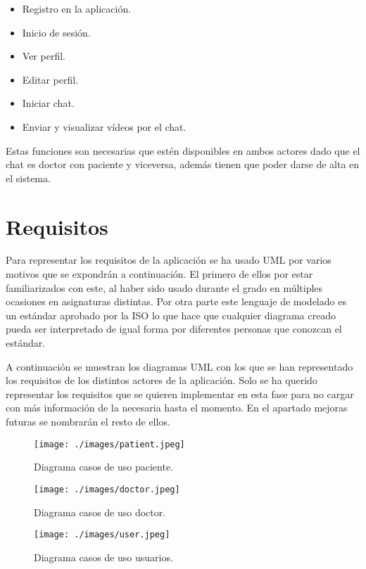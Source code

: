\begin{itemize}
    \item Registro en la aplicación.
    \item Inicio de sesión.
    \item Ver perfil.
    \item Editar perfil.
    \item Iniciar chat.
    \item Enviar y visualizar vídeos por el chat.
\end{itemize}

Estas funciones son necesarias que estén disponibles en ambos actores dado que el chat
es doctor con paciente y viceversa, además tienen que poder darse de alta en el sistema.

\section{Requisitos}
Para representar los requisitos de la aplicación se ha usado UML\cite{uml} por varios
motivos que se expondrán a continuación. El primero de ellos por estar familiarizados
con este, al haber sido usado durante el grado en múltiples ocasiones en asignaturas
distintas. Por otra parte este lenguaje de modelado es un estándar aprobado por la ISO
lo que hace que cualquier diagrama creado pueda ser interpretado de igual forma por
diferentes personas que conozcan el estándar.

\medskip
A continuación se muestran los diagramas UML con los que se han representado los
requisitos de los distintos actores de la aplicación. Solo se ha querido representar los
requisitos que se quieren implementar en esta fase para no cargar con más información de
la necesaria hasta el momento. En el apartado mejoras futuras se nombrarán el resto de ellos.

\medskip
\begin{figure}
    \texttt{[image: ./images/patient.jpeg]}
    \caption{Diagrama casos de uso paciente.}
    \label{Diagrama casos de uso paciente.}
\end{figure}

\medskip
\begin{figure}
    \texttt{[image: ./images/doctor.jpeg]}
    \caption{Diagrama casos de uso doctor.}
    \label{Diagrama casos de uso doctor.}
\end{figure}

\medskip
\begin{figure}
    \texttt{[image: ./images/user.jpeg]}
    \caption{Diagrama casos de uso usuarios.}
    \label{Diagrama casos de uso usuarios.}
\end{figure}

